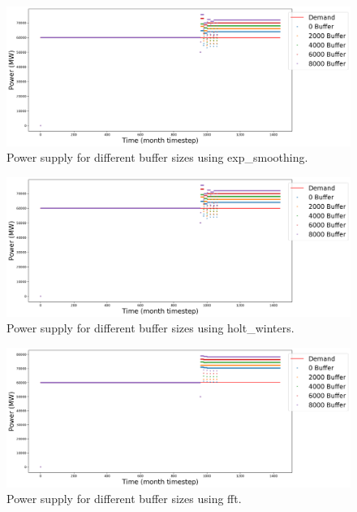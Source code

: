 \documentclass[11pt]{article}
\begin{document}
\begin{figure}[H]
	\centering
	\includegraphics[width=\textwidth]{29-figures/29-power-buffer-exp_smoothing.png} 
	\hfill
	\caption{Power supply for different buffer sizes using exp\_smoothing.}
	\label{fig:29-buf-exp_smoothing}
\end{figure}

\begin{figure}[H]
	\centering
	\includegraphics[width=\textwidth]{29-figures/29-power-buffer-holt_winters.png} 
	\hfill
	\caption{Power supply for different buffer sizes using holt\_winters.}
	\label{fig:29-buf-hots_winters}
\end{figure}

\begin{figure}[H]
	\centering
	\includegraphics[width=\textwidth]{29-figures/29-power-buffer-fft.png} 
	\hfill
	\caption{Power supply for different buffer sizes using fft.}
	\label{fig:29-buf-fft}
\end{figure}
\end{document}

